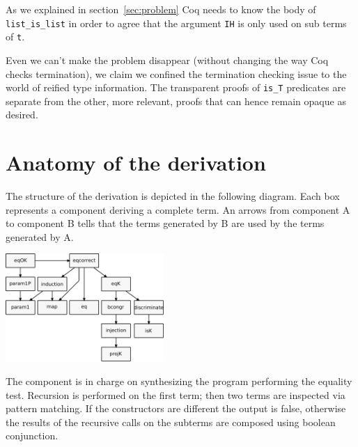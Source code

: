 \documentclass[sigplan,10pt,review]{acmart}\settopmatter{printfolios=true,printccs=false,printacmref=false}
\newcommand{\derive}[1]{\keys{#1}}
\begin{document}
As we explained in section~\ref{sec:problem} Coq needs to know the
body of  \lstinline+list_is_list+ in order to agree that the argument
\lstinline+IH+ is only used on sub terms of \lstinline+t+.

Even we can't make the problem disappear (without changing the way Coq
checks termination), we claim we confined the termination checking issue
to the world of reified type information. The transparent proofs of 
\lstinline+is_T+ predicates are separate from the other, more
relevant, proofs that can hence remain opaque as desired.

\section{Anatomy of the derivation} %
\label{sec:code}

The structure of the derivation is depicted in the following diagram.
Each box represents a component deriving a complete term.
An arrows from component A to component B tells that the terms
generated by B are used by the terms generated by A.

\includegraphics[width=0.45\textwidth]{derive.pdf}

The \derive{eq} component is in charge on synthesizing the program
performing the equality test. Recursion is performed on the first
term; then two terms are inspected via pattern matching. If the
constructors are different the output is false, otherwise the
results of the recursive calls on the subterms are composed using
boolean conjunction.
\end{document}
